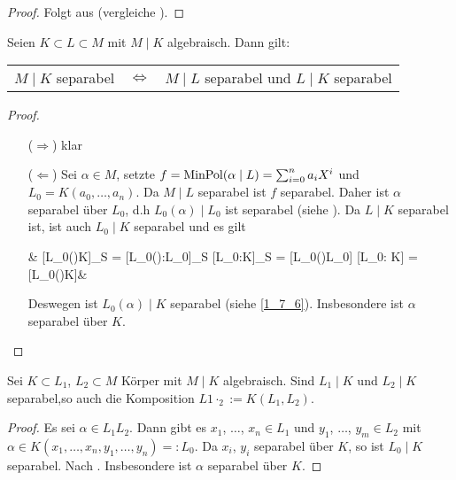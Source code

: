 \begin{proof}
	Folgt aus  (vergleiche ).
\end{proof}

\begin{conclusion}
	Seien $K\subset L\subset M$ mit $M\mid K$ algebraisch. Dann gilt:
	
	\begin{tabularx}{\linewidth}{X@{\quad}c@{\quad}X}
		\hfill $M\mid K$ separabel & $\Leftrightarrow$ & $M\mid L$ separabel und $L\mid K$ separabel
	\end{tabularx}
\end{conclusion}
\begin{proof}
	\leavevmode
	\begin{itemize}[topsep=-6pt]
		\item[($\Rightarrow$)] klar
		\item[($\Leftarrow$)] Sei $\alpha\in M$, setzte $f=\operatorname{MinPol}(\alpha\mid L) = \sum_{i=0}^n a_i X^i$ und $L_0 = K(a_0,\dots,a_n)$. Da $M\mid L$ separabel ist $f$ separabel. Daher ist $\alpha$ separabel über $L_0$, d.h $L_0(\alpha)\mid L_0$ ist separabel (siehe ). Da $L\mid K$ separabel ist, ist auch $L_0\mid K$ separabel und es gilt \begin{flalign*}
		\qquad & [L_0(\alpha)\mid K]_{\mathrm S} = [L_0(\alpha):L_0]_{\mathrm S} [L_0:K]_{\mathrm S} = [L_0(\alpha)\mid L_0] [L_0: K] = [L_0(\alpha)\mid K]&
	\end{flalign*}
	Deswegen ist $L_0(\alpha)\mid K$ separabel (siehe \cref{1_7_6}). Insbesondere ist $\alpha$ separabel über $K$.
	\end{itemize}
\end{proof}

\begin{conclusion}
Sei $K\subset L_1$, $L_2\subset M$ Körper mit $M\mid K$ algebraisch. Sind $L_1\mid K$ und $L_2\mid K$ separabel,so auch die Komposition $L1\cdot _2 := K(L_1,L_2)$.
\end{conclusion}
\begin{proof}
Es sei $\alpha\in L_1L_2$. Dann gibt es $x_1$, $\dots$, $x_n\in L_1$ und $y_1$, $\dots$, $y_m\in L_2$ mit $\alpha\in K(x_1,\dots,x_n,y_1,\dots,y_n) =: L_0$. Da $x_i$, $y_i$ separabel über $K$, so ist $L_0\mid K$ separabel. Nach . Insbesondere ist $\alpha$ separabel über $K$.
\end{proof}

